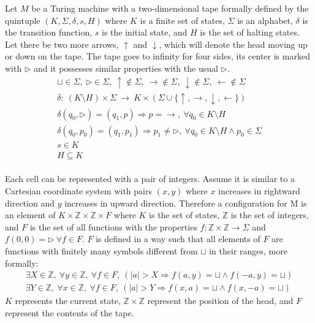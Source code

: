 \documentclass[a4paper]{article}
\begin{document}
Let $M$ be a Turing machine with a two-dimensional tape formally defined by the quintuple $(K, \Sigma, \delta, s, H)$ where $K$ is a finite set of states, $\Sigma$ is an alphabet, $\delta$ is the transition function, $s$ is the initial state, and $H$ is the set of halting states. Let there be two more arrows, $\uparrow$ and $\downarrow$, which will denote the head moving up or down on the tape. The tape goes to infinity for four sides, its center is marked with $\triangleright$ and it possesses similar properties with the usual $\triangleright$.
\begin{gather*}
\sqcup \in \Sigma,\ 
\triangleright \in \Sigma,\ 
\uparrow \notin \Sigma,\
\rightarrow \notin \Sigma,\ 
\downarrow \notin \Sigma,\
\leftarrow \notin \Sigma \\
\delta: \ (K \setminus H) \times \Sigma \ \rightarrow \ K \times (\Sigma \cup \{\uparrow, \rightarrow, \downarrow, \leftarrow\}) \\
\delta(q_0, \triangleright) = (q_1, p) \Rightarrow p = \rightarrow, \ \forall q_0 \in K \setminus H \\
\delta(q_0, p_0) = (q_1, p_1) \Rightarrow p_1 \neq \triangleright, \ \forall q_0 \in K \setminus H \land p_0 \in \Sigma \\
s \in K \\
H \subseteq K
\end{gather*}
\\
Each cell can be represented with a pair of integers. Assume it is similar to a Cartesian coordinate system with pairs $(x,y)$ where $x$ increases in rightward direction and $y$ increases in upward direction. Therefore a configuration for M is an element of $K \times \mathbb{Z} \times \mathbb{Z} \times F$ where $K$ is the set of states, $\mathbb{Z}$ is the set of integers, and $F$ is the set of all functions with the properties $f:\mathbb{Z} \times \mathbb{Z} \rightarrow \Sigma$ and $f(0,0)=\triangleright \ \forall f \in F$. $F$ is defined in a way such that all elements of $F$ are functions with finitely many symbols different from $\sqcup$ in their ranges, more formally:
\begin{gather*}
\exists X \in \mathbb{Z},\ \forall y \in \mathbb{Z},\ \forall f \in F,\ (\lvert a \rvert > X \Rightarrow f(a,y) = \sqcup \land f(-a,y) = \sqcup) \\
\exists Y \in \mathbb{Z},\ \forall x \in \mathbb{Z},\ \forall f \in F,\ (\lvert a \rvert > Y \Rightarrow f(x, a) = \sqcup \land f(x,-a) = \sqcup)
\end{gather*}
$K$ represents the current state, $\mathbb{Z} \times \mathbb{Z}$ represent the position of the head, and $F$ represent the contents of the tape. \\
\end{document}
